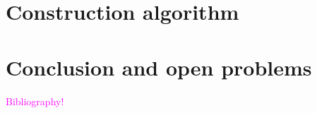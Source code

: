 \documentclass[a4paper,UKenglish,cleveref]{lipics-v2021}
\begin{document}
\section{Construction algorithm}
\label{s-construction}

\section{Conclusion and open problems}
\label{s-conclusion}


% 
% 

\textcolor{magenta}{Bibliography!}


\end{document}
